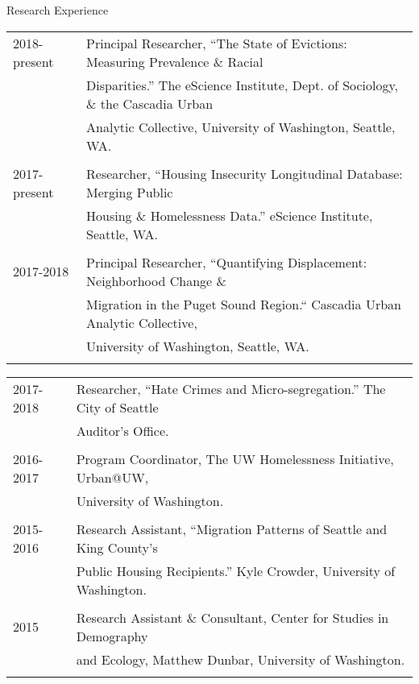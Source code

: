 \documentclass{resume} %
\begin{document}
\begin{rSection}{Research Experience}
\vspace{5mm}
\begin{tabular}{ @{} >{}l @{\hspace{6ex}} l }

2018-present	& Principal Researcher, ``The State of Evictions: Measuring Prevalence \& Racial\\
				& Disparities.'' The eScience Institute, Dept. of Sociology, \& the Cascadia Urban\\
				& Analytic Collective, University of Washington, Seattle, WA.\\\\

2017-present	& Researcher, ``Housing Insecurity Longitudinal Database: Merging Public\\
			& Housing \& Homelessness Data.'' eScience Institute, Seattle, WA.\\\\

2017-2018	& Principal Researcher, ``Quantifying Displacement: Neighborhood Change \&\\
				& Migration in the Puget Sound Region.`` Cascadia Urban Analytic Collective,\\
				& University of Washington, Seattle, WA.\\\\
\end{tabular}

\begin{tabular}{ @{} >{}l @{\hspace{6ex}} l }
2017-2018	& Researcher, ``Hate Crimes and Micro-segregation.'' The City of Seattle\\
			& Auditor's Office.\\\\

2016-2017	& Program Coordinator, The UW Homelessness Initiative, Urban@UW,\\
			& University of Washington.\\\\

2015-2016	& Research Assistant, ``Migration Patterns of Seattle and King County's\\
			& Public Housing Recipients.'' Kyle Crowder, University of Washington.\\\\

2015		& Research Assistant \& Consultant, Center for Studies in Demography\\
			& and Ecology, Matthew Dunbar, University of Washington.\\\\


\end{tabular}
\end{rSection}
\end{document}
